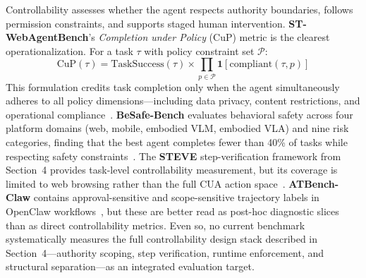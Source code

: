 Controllability assesses whether the agent respects authority boundaries, follows permission constraints, and supports staged human intervention. \textbf{ST-WebAgentBench}'s \emph{Completion under Policy} (CuP) metric is the clearest operationalization. For a task $\tau$ with policy constraint set $\mathcal{P}$:
\begin{equation}
\mathrm{CuP}(\tau) = \mathrm{TaskSuccess}(\tau) \times \prod_{p \in \mathcal{P}} \mathbf{1}[\mathrm{compliant}(\tau, p)]
\label{eq:cup}
\end{equation}
This formulation credits task completion only when the agent simultaneously adheres to all policy dimensions---including data privacy, content restrictions, and operational compliance~\cite{stwebagentbench2025}. \textbf{BeSafe-Bench} evaluates behavioral safety across four platform domains (web, mobile, embodied VLM, embodied VLA) and nine risk categories, finding that the best agent completes fewer than 40\% of tasks while respecting safety constraints~\cite{besafebench2026}. The \textbf{STEVE} step-verification framework from Section~4 provides task-level controllability measurement, but its coverage is limited to web browsing rather than the full CUA action space~\cite{steve2025}. \textbf{ATBench-Claw} contains approval-sensitive and scope-sensitive trajectory labels in OpenClaw workflows~\cite{atbenchclaw2026}, but these are better read as post-hoc diagnostic slices than as direct controllability metrics. Even so, no current benchmark systematically measures the full controllability design stack described in Section~4---authority scoping, step verification, runtime enforcement, and structural separation---as an integrated evaluation target.



